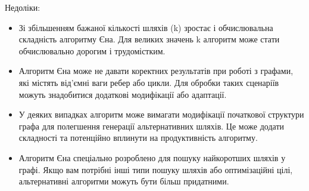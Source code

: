 Недоліки:
\begin{itemize}
    \item Зі збільшенням бажаної кількості шляхів (k) зростає і обчислювальна складність алгоритму Єна. Для великих значень k алгоритм може стати обчислювально дорогим і трудомістким.
    \item Алгоритм Єна може не давати коректних результатів при роботі з графами, які містять від'ємні ваги ребер або цикли. Для обробки таких сценаріїв можуть знадобитися додаткові модифікації або адаптації.
    \item У деяких випадках алгоритм може вимагати модифікації початкової структури графа для полегшення генерації альтернативних шляхів. Це може додати складності та потенційно вплинути на продуктивність алгоритму.
    \item Алгоритм Єна спеціально розроблено для пошуку найкоротших шляхів у графі. Якщо вам потрібні інші типи пошуку шляхів або оптимізаційні цілі, альтернативні алгоритми можуть бути більш придатними.
\end{itemize}
